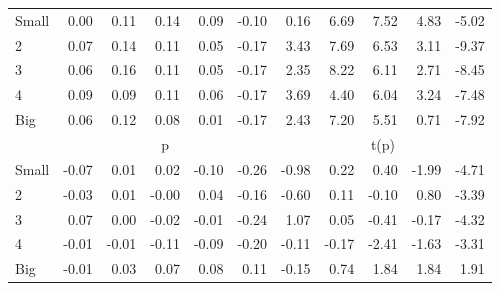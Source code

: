\begin{table}[!ht]
\begin{tabular}{lrrrrrrrrrr}
    \\
      \cmidrule(r){2-6} \cmidrule(r){7-11}

    Small   & 0.00  & 0.11  & 0.14  & 0.09  & -0.10  & 0.16  & 6.69  & 7.52  & 4.83  & -5.02  \\
         2  & 0.07  & 0.14  & 0.11  & 0.05  & -0.17  & 3.43  & 7.69  & 6.53  & 3.11  & -9.37  \\
         3  & 0.06  & 0.16  & 0.11  & 0.05  & -0.17  & 2.35  & 8.22  & 6.11  & 2.71  & -8.45  \\
         4  & 0.09  & 0.09  & 0.11  & 0.06  & -0.17  & 3.69  & 4.40  & 6.04  & 3.24  & -7.48  \\
    Big     & 0.06  & 0.12  & 0.08  & 0.01  & -0.17  & 2.43  & 7.20  & 5.51  & 0.71  & -7.92  \\

  
    
      & \multicolumn{5}{c}{p} & \multicolumn{5}{c}{t(p)}
    
    \\
      \cmidrule(r){2-6} \cmidrule(r){7-11}

    Small   & -0.07  & 0.01  & 0.02  & -0.10  & -0.26  & -0.98  & 0.22  & 0.40  & -1.99  & -4.71  \\
         2  & -0.03  & 0.01  & -0.00  & 0.04  & -0.16  & -0.60  & 0.11  & -0.10  & 0.80  & -3.39  \\
         3  & 0.07  & 0.00  & -0.02  & -0.01  & -0.24  & 1.07  & 0.05  & -0.41  & -0.17  & -4.32  \\
         4  & -0.01  & -0.01  & -0.11  & -0.09  & -0.20  & -0.11  & -0.17  & -2.41  & -1.63  & -3.31  \\
    Big     & -0.01  & 0.03  & 0.07  & 0.08  & 0.11  & -0.15  & 0.74  & 1.84  & 1.84  & 1.91  \\

  

  \bottomrule
\end{tabular}
\label{tbl:25_Size_Inv_B2016}
\end{table}
